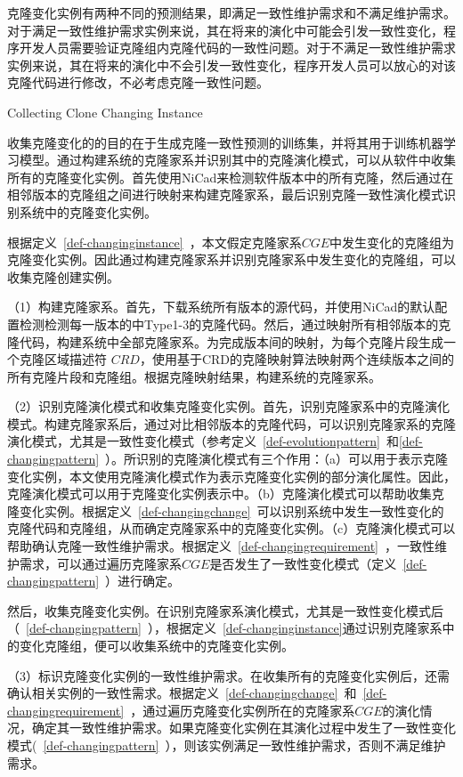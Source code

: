 克隆变化实例有两种不同的预测结果，即满足一致性维护需求和不满足维护需求。对于满足一致性维护需求实例来说，其在将来的演化中可能会引发一致性变化，程序开发人员需要验证克隆组内克隆代码的一致性问题。对于不满足一致性维护需求实例来说，其在将来的演化中不会引发一致性变化，程序开发人员可以放心的对该克隆代码进行修改，不必考虑克隆一致性问题。


{Collecting Clone Changing Instance}

收集克隆变化的的目的在于生成克隆一致性预测的训练集，并将其用于训练机器学习模型。通过构建系统的克隆家系并识别其中的克隆演化模式，可以从软件中收集所有的克隆变化实例。首先使用NiCad来检测软件版本中的所有克隆，然后通过在相邻版本的克隆组之间进行映射来构建克隆家系，最后识别克隆一致性演化模式识别系统中的克隆变化实例。

根据定义~\ref{def-changinginstance}~，本文假定克隆家系$CGE$中发生变化的克隆组为克隆变化实例。因此通过构建克隆家系并识别克隆家系中发生变化的克隆组，可以收集克隆创建实例。

（1）构建克隆家系。首先，下载系统所有版本的源代码，并使用NiCad的默认配置检测检测每一版本的中Type1-3的克隆代码。然后，通过映射所有相邻版本的克隆代码，构建系统中全部克隆家系。为完成版本间的映射，为每个克隆片段生成一个克隆区域描述符 $CRD$\cite{duala2010clone}，使用基于CRD的克隆映射算法映射两个连续版本之间的所有克隆片段和克隆组\cite{ci2013new}\cite{ci2013newD}。根据克隆映射结果，构建系统的克隆家系。

（2）识别克隆演化模式和收集克隆变化实例。首先，识别克隆家系中的克隆演化模式。构建克隆家系后，通过对比相邻版本的克隆代码，可以识别克隆家系的克隆演化模式，尤其是一致性变化模式（参考定义~\ref{def-evolutionpattern}~和\ref{def-changingpattern}~）。所识别的克隆演化模式有三个作用：（a）可以用于表示克隆变化实例，本文使用克隆演化模式作为表示克隆变化实例的部分演化属性。因此，克隆演化模式可以用于克隆变化实例表示中。（b）克隆演化模式可以帮助收集克隆变化实例。根据定义~\ref{def-changingchange}~可以识别系统中发生一致性变化的克隆代码和克隆组，从而确定克隆家系中的克隆变化实例。（c）克隆演化模式可以帮助确认克隆一致性维护需求。根据定义~\ref{def-changingrequirement}~，一致性维护需求，可以通过遍历克隆家系$CGE$是否发生了一致性变化模式（定义~\ref{def-changingpattern}~）进行确定。

然后，收集克隆变化实例。在识别克隆家系演化模式，尤其是一致性变化模式后（~\ref{def-changingpattern}~），根据定义~\ref{def-changinginstance}通过识别克隆家系中的变化克隆组，便可以收集系统中的克隆变化实例。

（3）标识克隆变化实例的一致性维护需求。在收集所有的克隆变化实例后，还需确认相关实例的一致性需求。根据定义~\ref{def-changingchange}~和~\ref{def-changingrequirement}~，通过遍历克隆变化实例所在的克隆家系$CGE$的演化情况，确定其一致性维护需求。如果克隆变化实例在其演化过程中发生了一致性变化模式(~\ref{def-changingpattern}~），则该实例满足一致性维护需求，否则不满足维护需求。

